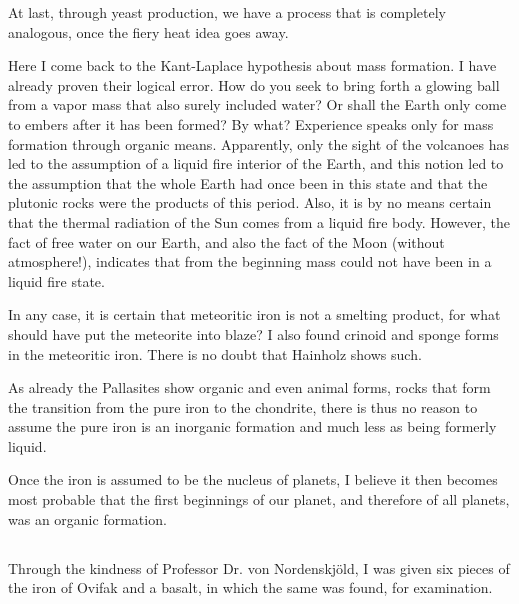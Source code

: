 \documentclass[a4paper, 12pt, oneside]{article}
\begin{document}
At last, through yeast production, we have a process that is completely analogous, once the fiery heat idea goes away.

Here I come back to the Kant-Laplace hypothesis about mass formation. I have already proven their logical error. How do you seek to bring forth a glowing ball from a vapor mass that also surely included water? Or shall the Earth only come to embers after it has been formed? By what? Experience speaks only for mass formation through organic means. Apparently, only the sight of the volcanoes has led to the assumption of a liquid fire interior of the Earth, and this notion led to the assumption that the whole Earth had once been in this state and that the plutonic rocks were the products of this period. Also, it is by no means certain that the thermal radiation of the Sun comes from a liquid fire body. However, the fact of free water on our Earth, and also the fact of the Moon (without atmosphere!), indicates that from the beginning mass could not have been in a liquid fire state.

In any case, it is certain that meteoritic iron is not a smelting product, for what should have put the meteorite into blaze? I also found crinoid and sponge forms in the meteoritic iron. There is no doubt that Hainholz shows such.

As already the Pallasites show organic and even animal forms, rocks that form the transition from the pure iron to the chondrite, there is thus no reason to assume the pure iron is an inorganic formation and much less as being formerly liquid.

Once the iron is assumed to be the nucleus of planets, I believe it then becomes most probable that the first beginnings of our planet, and therefore of all planets, was an organic formation.
\clearpage
\subsection{}
\paragraph*{}
Through the kindness of Professor Dr. von Nordenskjöld, I was given six pieces of the iron of Ovifak and a basalt, in which the same was found, for examination.
\end{document}
